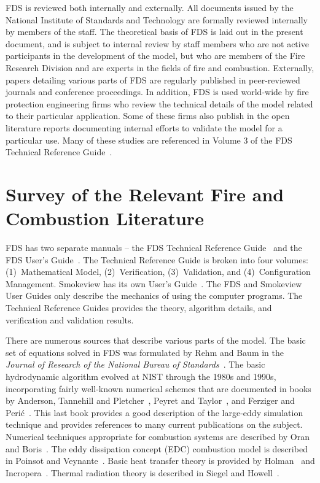 \documentclass[11pt]{book}
\begin{document}
FDS is reviewed both internally and externally. All documents issued by the National Institute of Standards and Technology are formally reviewed internally by members of the staff. The theoretical basis of FDS is laid out in the present document, and is subject to internal review by staff members who are not active participants in the development of the model, but who are members of the Fire Research Division and are experts in the fields of fire and combustion. Externally, papers detailing various parts of FDS are regularly published in peer-reviewed journals and conference proceedings. In addition, FDS is used world-wide by fire protection engineering firms who review the technical details of the model related to their particular application. Some of these firms also publish in the open literature reports documenting internal efforts to validate the model for a particular use. Many of these studies are referenced in Volume 3 of the FDS Technical Reference Guide~\cite{FDS_Tech_Guide}.


\section{Survey of the Relevant Fire and Combustion Literature}

\label{Relevantdocs}

FDS has two separate manuals -- the FDS Technical Reference Guide~\cite{FDS_Tech_Guide} and the FDS User's Guide~\cite{FDS_Users_Guide}. The Technical Reference Guide is broken into four volumes: (1)~Mathematical Model, (2)~Verification, (3)~Validation, and (4)~Configuration Management. Smokeview has its own User's Guide~\cite{Smokeview_Users_Guide}. The FDS and Smokeview User Guides only describe the mechanics of using the computer programs. The Technical Reference Guides provides the theory, algorithm details, and verification and validation results.

There are numerous sources that describe various parts of the model. The basic set of equations solved in FDS was formulated by Rehm and Baum in the {\em Journal of Research of the National Bureau of Standards}~\cite{Rehm:1}.  The basic hydrodynamic algorithm evolved at NIST through the 1980s and 1990s, incorporating fairly well-known numerical schemes that are documented in books by Anderson, Tannehill and Pletcher~\cite{Anderson:1}, Peyret and Taylor~\cite{Peyret:1}, and Ferziger and Peri\'{c}~\cite{Ferziger:1}. This last book provides a good description of the large-eddy simulation technique and provides references to many current publications on the subject.  Numerical techniques appropriate for combustion systems are described by Oran and Boris~\cite{Oran:1}.  The eddy dissipation concept (EDC) combustion model is described in Poinsot and Veynante~\cite{Poinsot:TNC}. Basic heat transfer theory is provided by Holman~\cite{Holman:1} and Incropera~\cite{Incropera:1}. Thermal radiation theory is described in Siegel and Howell~\cite{Siegel:1}.
\end{document}

